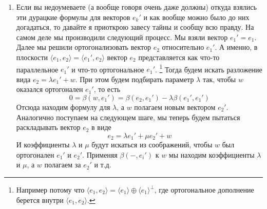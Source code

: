 \begin{enumerate}
\item Если вы недоумеваете (а вообще говоря очень даже должны) откуда взялись эти дурацкие формулы для векторов $e_k'$ и как вообще можно было до них догадаться, то давайте я приоткрою завесу тайны и сообщу всю правду.
На самом деле мы производили следующий процесс.
Мы взяли вектор $e_1' = e_1$.
Далее мы решили ортогонализовать вектор $e_2$ относительно $e_1'$.
А именно, в плоскости $\langle e_1, e_2\rangle = \langle e_1', e_2\rangle$ вектор $e_2$ представляется как что-то параллельное $e_1'$ и что-то ортогональное $e_1'$.%
\footnote{Например потому что $\langle e_1, e_2\rangle = \langle e_1\rangle \oplus \langle e_1\rangle^\bot$, где ортогональное дополнение берется внутри $\langle e_1,e_2\rangle$.}
Тогда будем искать разложение вида $e_2 = \lambda e_1' + w$.
При этом будем подбирать параметр $\lambda$ так, чтобы $w$ оказался ортогонален $e_1'$, то есть
\[
0 = \beta(w, e_1')  = \beta(e_2, e_1') - \lambda\beta( e_1',e_1')
\]
Отсюда находим формулу для $\lambda$, а $w$ полагаем новым вектором $e_2'$.
Аналогично поступаем на следующем шаге, мы теперь будем пытаться раскладывать вектор $e_2$ в виде
\[
e_2 = \lambda e_1' + \mu e_2' + w
\]
И коэффициенты $\lambda$ и $\mu$ будут искаться из соображений, чтобы $w$ был ортогонален $e_1'$ и $e_2'$.
Применяя $\beta({-}, e_i')$ к $w$ мы находим коэффициенты $\lambda$ и $\mu$, а $w$ полагаем за $e_2'$ и т.д.
\end{enumerate}
